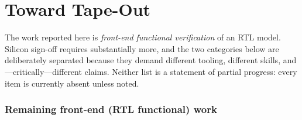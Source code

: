 \documentclass[conference]{IEEEtran}
\begin{document}
\section{Toward Tape-Out}
\label{sec:tapeout}

The work reported here is \emph{front-end functional verification} of an
RTL model. Silicon sign-off requires substantially more, and the two
categories below are deliberately separated because they demand different
tooling, different skills, and---critically---different claims. Neither
list is a statement of partial progress: every item is currently absent
unless noted.

\subsubsection{Remaining front-end (RTL functional) work}
\end{document}
